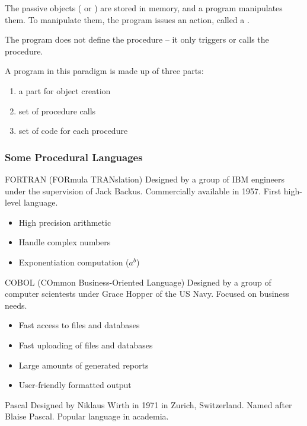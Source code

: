\documentclass[\main/notes.tex]{subfiles}
\begin{document}
				The passive objects ( or ) are stored in memory, and a program manipulates them. To manipulate them, the program issues an action, called a .

				The program does not define the procedure -- it only triggers or calls the procedure.

				A program in this paradigm is made up of three parts:
				\begin{enumerate}[nosep]
					\item a part for object creation
					\item set of procedure calls
					\item set of code for each procedure
				\end{enumerate}
				\subsubsection{Some Procedural Languages}
					\begin{definition}{FORTRAN (FORmula TRANslation)}
						Designed by a group of IBM engineers under the supervision of Jack Backus. Commercially available in 1957. First high-level language.
						\begin{itemize}[nosep]
							\item High precision arithmetic
							\item Handle complex numbers
							\item Exponentiation computation ($a^{b}$)
						\end{itemize}
					\end{definition}
					\begin{definition}{COBOL (COmmon Business-Oriented Language)}
						Designed by a group of computer scientests under Grace Hopper of the US Navy. Focused on business needs.
						\begin{itemize}[nosep]
							\item Fast access to files and databases
							\item Fast uploading of files and databases
							\item Large amounts of generated reports
							\item User-friendly formatted output
						\end{itemize}
					\end{definition}
					\begin{definition}{Pascal}
						Designed by Niklaus Wirth in 1971 in Zurich, Switzerland. Named after Blaise Pascal. Popular language in academia.
					\end{definition}
\end{document}
